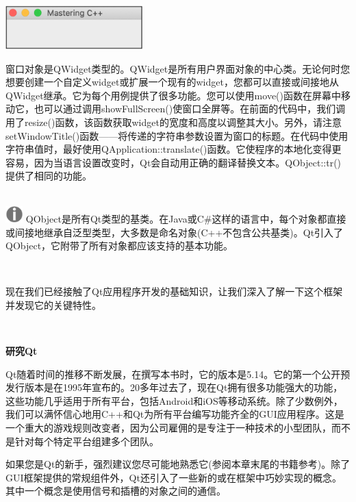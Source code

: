 \begin{center}
	\includegraphics[width=0.4\textwidth]{content/Section-2/Chapter-14/7}
\end{center}

窗口对象是QWidget类型的。QWidget是所有用户界面对象的中心类。无论何时您想要创建一个自定义widget或扩展一个现有的widget，您都可以直接或间接地从QWidget继承。它为每个用例提供了很多功能。您可以使用move()函数在屏幕中移动它，也可以通过调用showFullScreen()使窗口全屏等。在前面的代码中，我们调用了resize()函数，该函数获取widget的宽度和高度以调整其大小。另外，请注意setWindowTitle()函数——将传递的字符串参数设置为窗口的标题。在代码中使用字符串值时，最好使用QApplication::translate()函数。它使程序的本地化变得更容易，因为当语言设置改变时，Qt会自动用正确的翻译替换文本。QObject::tr()提供了相同的功能。 \par

\hspace*{\fill} \\ %
\includegraphics[width=0.05\textwidth]{images/warn}
QObject是所有Qt类型的基类。在Java或C\#这样的语言中，每个对象都直接或间接地继承自泛型类型，大多数是命名对象(C++不包含公共基类)。Qt引入了QObject，它附带了所有对象都应该支持的基本功能。 \par
\noindent\textbf{}\ \par

现在我们已经接触了Qt应用程序开发的基础知识，让我们深入了解一下这个框架并发现它的关键特性。 \par

\noindent\textbf{}\ \par
\textbf{研究Qt} \ \par
Qt随着时间的推移不断发展，在撰写本书时，它的版本是5.14。它的第一个公开预发行版本是在1995年宣布的。20多年过去了，现在Qt拥有很多功能强大的功能，这些功能几乎适用于所有平台，包括Android和iOS等移动系统。除了少数例外，我们可以满怀信心地用C++和Qt为所有平台编写功能齐全的GUI应用程序。这是一个重大的游戏规则改变者，因为公司雇佣的是专注于一种技术的小型团队，而不是针对每个特定平台组建多个团队。 \par
如果您是Qt的新手，强烈建议您尽可能地熟悉它(参阅本章末尾的书籍参考)。除了GUI框架提供的常规组件外，Qt还引入了一些新的或在框架中巧妙实现的概念。其中一个概念是使用信号和插槽的对象之间的通信。 \par

